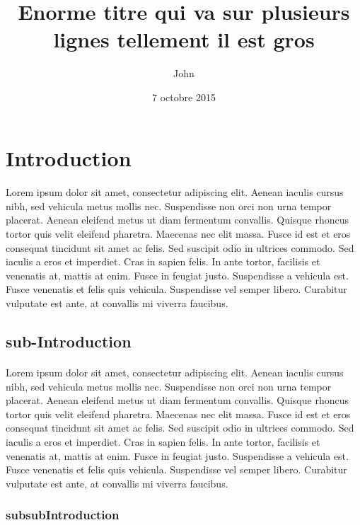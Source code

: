 \documentclass[11pt]{bioinlab}
\title{Enorme titre qui va sur plusieurs lignes tellement il est gros}
\author{John \bsc{Doe}}
\date{7 octobre 2015}
\begin{document}
\maketitle

\newpage
\tableofcontents

\newpage

\section{Introduction}
\paragraph{}Lorem ipsum dolor sit amet, consectetur adipiscing elit. Aenean iaculis cursus nibh, sed vehicula metus mollis nec. Suspendisse non orci non urna tempor placerat. Aenean eleifend metus ut diam fermentum convallis. Quisque rhoncus tortor quis velit eleifend pharetra. Maecenas nec elit massa. Fusce id est et eros consequat tincidunt sit amet ac felis. Sed suscipit odio in ultrices commodo. Sed iaculis a eros et imperdiet. Cras in sapien felis. In ante tortor, facilisis et venenatis at, mattis at enim. Fusce in feugiat justo. Suspendisse a vehicula est. Fusce venenatis et felis quis vehicula. Suspendisse vel semper libero. Curabitur vulputate est ante, at convallis mi viverra faucibus.
\subsection{sub-Introduction}
\paragraph{}Lorem ipsum dolor sit amet, consectetur adipiscing elit. Aenean iaculis cursus nibh, sed vehicula metus mollis nec. Suspendisse non orci non urna tempor placerat. Aenean eleifend metus ut diam fermentum convallis. Quisque rhoncus tortor quis velit eleifend pharetra. Maecenas nec elit massa. Fusce id est et eros consequat tincidunt sit amet ac felis. Sed suscipit odio in ultrices commodo. Sed iaculis a eros et imperdiet. Cras in sapien felis. In ante tortor, facilisis et venenatis at, mattis at enim. Fusce in feugiat justo. Suspendisse a vehicula est. Fusce venenatis et felis quis vehicula. Suspendisse vel semper libero. Curabitur vulputate est ante, at convallis mi viverra faucibus.
\subsubsection{subsubIntroduction}
\end{document}
